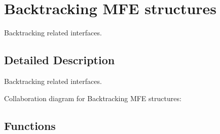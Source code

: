 \hypertarget{group__mfe__backtracking}{}\section{Backtracking M\+FE structures}
\label{group__mfe__backtracking}


Backtracking related interfaces.  




\subsection{Detailed Description}
Backtracking related interfaces. 

Collaboration diagram for Backtracking M\+FE structures\+:
\subsection*{Functions}
